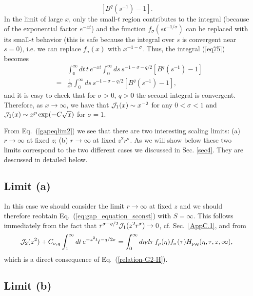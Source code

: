 \documentclass[a4paper,12pt]{article}
\begin{document}
{\begin{equation}
   \left[B^q\left( s^{-1} \right)-1\right] .
\label{eq75}
\end{equation}
In the limit of large $x$, only the small-$t$ region contributes
to the integral (because of the exponential factor $e^{-x t}$) and
the function $f_\sigma(s t^{-1/\sigma})$ can be replaced with its
small-$t$ behavior (this is safe because the integral over $s$
is convergent near $s=0$), i.e. we can replace $f_\sigma(x)$ with  
$x^{-1-\sigma}$. Thus, the integral (\ref{eq75}) becomes
\begin{eqnarray}
&& 
\int_0^\infty dt \, t\, e^{-x t} \int_{0}^\infty ds\,
s^{-1-\sigma-q/2} \left[B^q\left( s^{-1} \right)-1\right] 
\nonumber \\
& = & \frac{1}{x^2} \int_{0}^\infty ds\,
s^{-1-\sigma-q/2} \left[B^q\left( s^{-1} \right)-1\right],
\end{eqnarray}
and it is easy to check that for $\sigma>0$, $q>0$ the second integral
is convergent.  Therefore, as $x \to \infty$, we have that 
${\cal J}_1(x) \sim x^{-2}$ for any $0 < \sigma < 1$ and 
${\cal J}_1(x) \sim x^p \exp (- C\sqrt{x})$ for $\sigma = 1$.

From Eq.~(\ref{gapeqlim2}) we see that there are two interesting scaling
limits: (a) $r\to \infty$ at fixed $z$; 
(b) $r\to \infty$ at fixed $z^2 r^\sigma$. As we will show below these two 
limits correspond to the two different cases we discussed in Sec. \ref{sec4}.
They are descussed in detailed below.

\subsection{Limit (a)} \label{AppC.2}

In this case we should consider the limit $r\to \infty$ at fixed $z$ 
and we should therefore reobtain Eq.~(\ref{eq:gap_equation_sconst}) 
with $S=\infty$. This follows immediately from the fact that 
$r^{\sigma-q/2} {\cal J}_1 (z^2 r^\sigma) \to 0$, cf. Sec.~\ref{AppC.1}, 
and from 
\begin{eqnarray}
{\cal J}_2(z^2) + C_{\sigma,q}\int_1^\infty dt\, e^{-z^2t} t^{-q/2\sigma} = 
\int_0^\infty d\eta d\tau\, f_\rho(\eta)f_\sigma(\tau) 
   H_{p,q}(\eta,\tau,z,\infty),
\end{eqnarray}
which is a direct consequence of Eq.~(\ref{relation-G2-H}).

\subsection{Limit (b)} \label{AppC.3}

}
\end{document}
